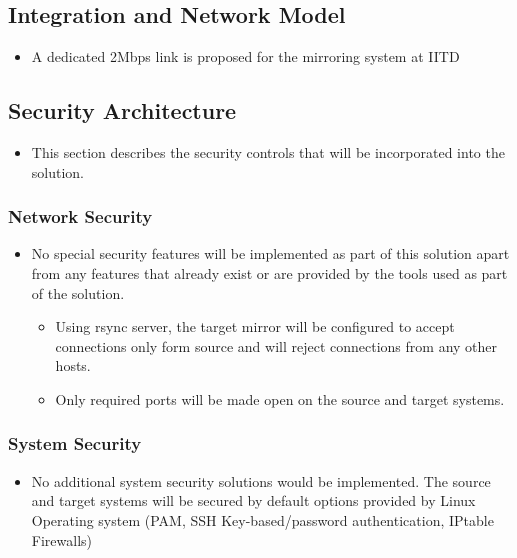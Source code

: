 \documentclass[11pt]{article}
\begin{document}
\subsection{Integration and Network Model}
\label{sec-8.5}

\begin{itemize}
\item A dedicated 2Mbps link is proposed for the mirroring system at IITD
\end{itemize}
\subsection{Security Architecture}
\label{sec-8.6}

\begin{itemize}
\item This section describes the security controls that will be
    incorporated into the solution.
\end{itemize}
\subsubsection{Network Security}
\label{sec-8.6.1}

\begin{itemize}
\item No special security features will be implemented as part of this
   solution apart from any features that already exist or are provided
   by the tools used as part of the solution.

\begin{itemize}
\item Using rsync server, the target mirror will be configured to
       accept connections only form source and will reject connections
       from any other hosts.
\item Only required ports will be made open on the source and target
       systems.
\end{itemize}

\end{itemize}
\subsubsection{System Security}
\label{sec-8.6.2}

\begin{itemize}
\item No additional system security solutions would be implemented. The
   source and target systems will be secured by default options
   provided by Linux Operating system (PAM, SSH Key-based/password
   authentication, IPtable Firewalls)
\end{itemize}
\end{document}
